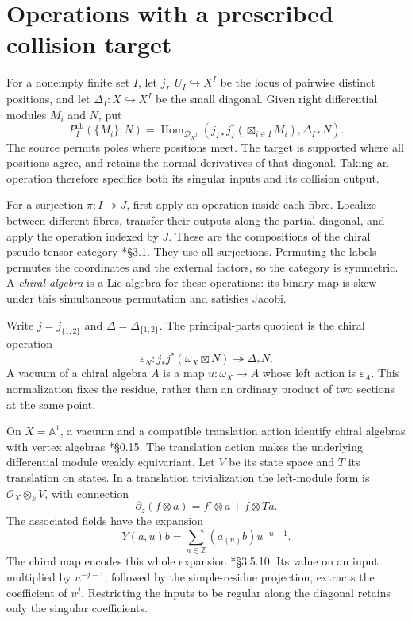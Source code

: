 \section{Operations with a prescribed collision target}
\label{e1f:sec:pch}

For\label{e1f:def:distinct-configuration-open} a nonempty finite set \(I\), let
\(j_I:U_I\hookrightarrow X^I\) be the locus of pairwise distinct
positions, and let \(\Delta_I:X\hookrightarrow X^I\) be the small
diagonal. Given right differential modules \(M_i\) and \(N\), put
\begin{equation}\label{e1f:eq:pch}
 P_I^{\mathrm{ch}}(\{M_i\};N)
 =\operatorname{Hom}_{\mathcal D_{X^I}}
 \left(j_{I*}j_I^*\!\left(\boxtimes_{i\in I}M_i\right),
                    \Delta_{I*}N\right).
\end{equation}
The source permits poles where positions meet. The target is
supported where all positions agree, and retains the normal
derivatives of that diagonal. Taking an operation therefore
specifies both its singular inputs and its collision output.

For a surjection \(\pi:I\twoheadrightarrow J\), first apply an
operation inside each fibre. Localize between different fibres,
transfer their outputs along the partial diagonal, and apply the
operation indexed by \(J\). These are the compositions of the
chiral pseudo-tensor category \cite{chhop:BD}*{\S3.1}. They use
all surjections. Permuting the labels permutes the coordinates
and the external factors, so the category is symmetric.
A \emph{chiral algebra} is a Lie algebra for these operations:
its binary map is skew under this simultaneous permutation and
satisfies Jacobi.

Write\label{e1f:def:binary-open-diagonal} \(j=j_{\{1,2\}}\) and \(\Delta=\Delta_{\{1,2\}}\).
The principal-parts quotient is the chiral operation
\begin{equation}\label{e1f:eq:unit}
 \varepsilon_N:
 j_*j^*(\omega_X\boxtimes N)\twoheadrightarrow\Delta_*N.
\end{equation}
A vacuum of a chiral algebra \(A\) is a map
\(u:\omega_X\to A\) whose left action is \(\varepsilon_A\).
This normalization fixes the residue, rather than an ordinary
product of two sections at the same point.

On\label{e1f:def:translation-state-space} \(X=\mathbb A^1\), a vacuum and a compatible translation
action identify chiral algebras with vertex algebras
\cite{chhop:BD}*{\S0.15}. The translation action makes the
underlying differential module weakly equivariant. Let \(V\)
be its state space and \(T\) its translation on states. In a
translation trivialization the left-module form is
\(\mathcal O_X\otimes_k V\), with connection
\[
 \partial_z(f\otimes a)=f'\otimes a+f\otimes Ta.
\]
The\label{e1f:def:state-field-expansion} associated fields have the expansion
\[
 Y(a,u)b=\sum_{n\in\mathbb Z}(a_{(n)}b)u^{-n-1}.
\]
The chiral map encodes this whole expansion
\cite{chhop:BD}*{\S3.5.10}. Its value on an input multiplied by
\(u^{-j-1}\), followed by the simple-residue projection, extracts
the coefficient of \(u^j\). Restricting the inputs to be regular
along the diagonal retains only the singular coefficients.

